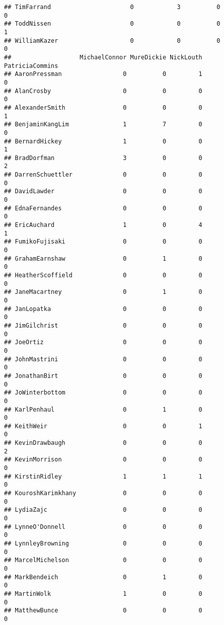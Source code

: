 \documentclass[
  12pt,
]{article}
\begin{document}
\begin{verbatim}
## TimFarrand                      0            3          0            0
## ToddNissen                      0            0          0            1
## WilliamKazer                    0            0          0            0
##                   MichaelConnor MureDickie NickLouth PatriciaCommins
## AaronPressman                 0          0         1               0
## AlanCrosby                    0          0         0               0
## AlexanderSmith                0          0         0               1
## BenjaminKangLim               1          7         0               0
## BernardHickey                 1          0         0               1
## BradDorfman                   3          0         0               2
## DarrenSchuettler              0          0         0               0
## DavidLawder                   0          0         0               0
## EdnaFernandes                 0          0         0               0
## EricAuchard                   1          0         4               1
## FumikoFujisaki                0          0         0               0
## GrahamEarnshaw                0          1         0               0
## HeatherScoffield              0          0         0               0
## JaneMacartney                 0          1         0               0
## JanLopatka                    0          0         0               0
## JimGilchrist                  0          0         0               0
## JoeOrtiz                      0          0         0               0
## JohnMastrini                  0          0         0               0
## JonathanBirt                  0          0         0               0
## JoWinterbottom                0          0         0               0
## KarlPenhaul                   0          1         0               0
## KeithWeir                     0          0         1               0
## KevinDrawbaugh                0          0         0               2
## KevinMorrison                 0          0         0               0
## KirstinRidley                 1          1         1               0
## KouroshKarimkhany             0          0         0               0
## LydiaZajc                     0          0         0               0
## LynneO'Donnell                0          0         0               0
## LynnleyBrowning               0          0         0               0
## MarcelMichelson               0          0         0               0
## MarkBendeich                  0          1         0               0
## MartinWolk                    1          0         0               0
## MatthewBunce                  0          0         0               0

\end{verbatim}
\end{document}
